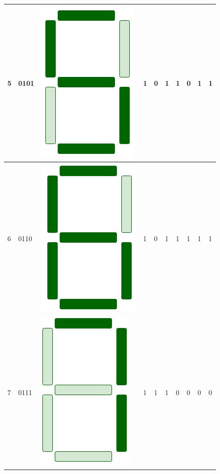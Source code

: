 \documentclass[12pt,singleside,a4paper]{article}
\begin{document}
\begin{center}
\begin{tabular}{ |p{1cm}|p{1cm}|p{1.5cm}|p{1cm}|p{1cm}|p{1cm}|p{1cm}|p{1cm}|p{1cm}|p{1cm}|}
    5   &   0101    &     \includegraphics[scale=0.1]{Display/5.png}       &   1   &   0   &   1   &   1   &   0   &   1   &   1   \\\hline
    6   &   0110    &      \includegraphics[scale=0.1]{Display/6.png}      &   1   &   0   &   1   &   1   &   1   &   1   &   1   \\\hline
    7   &   0111    &     \includegraphics[scale=0.1]{Display/7.png}       &   1   &   1   &   1   &   0   &   0   &   0   &   0   \\\hline

\end{tabular}
\end{center}
\end{document}
